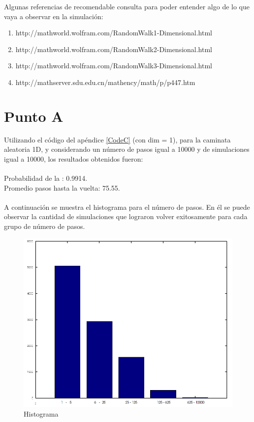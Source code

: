 \documentclass[a4paper,10pt]{article}
\begin{document}
Algunas referencias de recomendable consulta para poder entender algo de lo que vaya a observar en la simulaci\'on:
\begin{enumerate}
\item http://mathworld.wolfram.com/RandomWalk1-Dimensional.html
\item http://mathworld.wolfram.com/RandomWalk2-Dimensional.html
\item http://mathworld.wolfram.com/RandomWalk3-Dimensional.html
\item http://mathserver.sdu.edu.cn/mathency/math/p/p447.htm
\end{enumerate}
\newpage

\section{Punto A} 
Utilizando el c\'odigo del ap\'endice \ref{CodeC} (con dim = 1), para la caminata aleatoria 1D, y considerando un n\'umero de pasos igual a 10000 y 
de simulaciones igual a 10000, los resultados obtenidos fueron:
\\
\\  Probabilidad de la : 0.9914.
\\  Promedio pasos hasta la vuelta: 75.55.
\\
\\ A continuaci\'on se muestra el histograma para el n\'umero de pasos. En \'el se puede observar la cantidad de simulaciones que 
lograron volver exitosamente para cada grupo de n\'umero de pasos.
\begin{center}
  \begin{figure}[H]
  \includegraphics[scale=0.5]{./images/bar1edit.png}
    \caption{Histograma}
  \end{figure}
\end{center}
\end{document}
